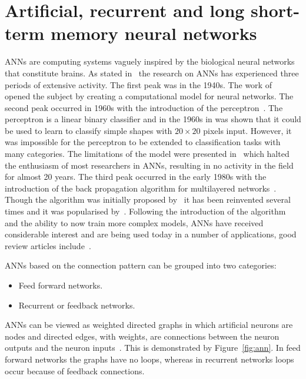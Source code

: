 \section{Artificial, recurrent and long short-term memory neural networks}\label{section:artificial_neural_networks}

ANNs are computing systems vaguely inspired by the biological neural networks
that constitute brains. As stated in~\cite{Jain1996} the research on ANNs
has experienced three periods of extensive activity. The first peak was in the
1940s. The work of~\cite{McCulloch1943} opened the subject by creating a
computational model for neural networks. The second peak occurred in 1960s with
the introduction of the perceptron~\cite{Rosenblatt1958}. The perceptron is a
linear binary classifier and in the 1960s in was shown that it could be used to
learn to classify simple shapes with \(20\times20\) pixels input. However, it
was impossible for the perceptron to be extended to classification tasks with
many categories. The limitations of the model were presented
in~\cite{Minsky1969} which halted the enthusiasm of most researchers in ANNs,
resulting in no activity in the field for almost 20 years. The third peak occurred
in the early 1980s with the introduction of the back propagation algorithm for
multilayered networks~\cite{Werbos1974}. Though the algorithm was initially
proposed by~\cite{Werbos1974} it has been reinvented several times and it was
popularised by~\cite{McClelland1986}. Following the introduction of the
algorithm and the ability to now train more complex models, ANNs have received
considerable interest and are being used today in a number of applications,
good review articles include~\cite{Abiodun2019, Li2010, Mohanraj2015, Shahid2019}.

ANNs based on the connection pattern can be grouped into two categories:

\begin{itemize}
    \item Feed forward networks.
    \item Recurrent or feedback networks.
\end{itemize}

ANNs can be viewed as weighted directed graphs in which artificial neurons are
nodes and directed edges, with weights, are connections between the neuron
outputs and the neuron inputs~\cite{Jain1996}. This is demonstrated by Figure~\ref{fig:ann}.
In feed forward networks the
graphs have no loops, whereas in recurrent networks loops occur because of feedback
connections.

